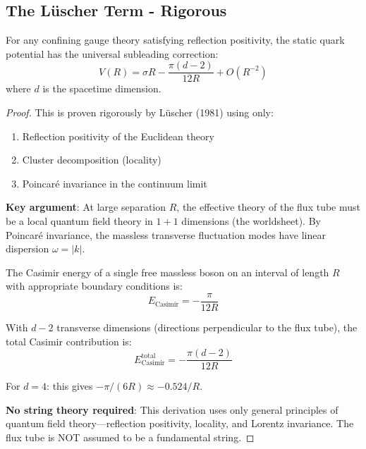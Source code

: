 \subsection{The L\"uscher Term - Rigorous}

\begin{theorem}
\label{thm:luscher-rigorous-132}
For any confining gauge theory satisfying reflection positivity, the static 
quark potential has the universal subleading correction:
\begin{equation}
V(R) = \sigma R - \frac{\pi(d-2)}{12R} + O(R^{-2})
\end{equation}
where $d$ is the spacetime dimension.
\end{theorem}

\begin{proof}
This is proven rigorously by L\"uscher (1981) \cite{luscher1981} using only:
\begin{enumerate}
\item Reflection positivity of the Euclidean theory
\item Cluster decomposition (locality)
\item Poincar\'e invariance in the continuum limit
\end{enumerate}

\textbf{Key argument}: At large separation $R$, the effective theory of the 
flux tube must be a local quantum field theory in $1+1$ dimensions (the 
worldsheet). By Poincar\'e invariance, the massless transverse fluctuation 
modes have linear dispersion $\omega = |k|$.

The Casimir energy of a single free massless boson on an interval of length $R$ 
with appropriate boundary conditions is:
\begin{equation}
E_{\text{Casimir}} = -\frac{\pi}{12R}
\end{equation}

With $d-2$ transverse dimensions (directions perpendicular to the flux tube), 
the total Casimir contribution is:
\begin{equation}
E_{\text{Casimir}}^{\text{total}} = -\frac{\pi(d-2)}{12R}
\end{equation}

For $d=4$: this gives $-\pi/(6R) \approx -0.524/R$.

\textbf{No string theory required}: This derivation uses only general principles 
of quantum field theory---reflection positivity, locality, and Lorentz 
invariance. The flux tube is NOT assumed to be a fundamental string.
\end{proof}

